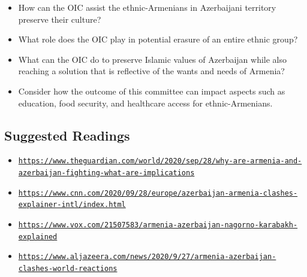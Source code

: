 \documentclass[10pt, letterpaper]{article}
\begin{document}
\begin{itemize}
\item
  
  How can the OIC assist the ethnic-Armenians in Azerbaijani territory
  preserve their culture?
  
\item
  
  What role does the OIC play in potential erasure of an entire ethnic
  group?
  
\item
  
  What can the OIC do to preserve Islamic values of Azerbaijan while
  also reaching a solution that is reflective of the wants and needs of
  Armenia?
  
\item
  
  Consider how the outcome of this committee can impact aspects such as
  education, food security, and healthcare access for ethnic-Armenians.
  
\end{itemize}

\subsection{Suggested Readings}

\begin{itemize}
\item
  
  \texttt{\href{https://www.theguardian.com/world/2020/sep/28/why-are-armenia-and-azerbaijan-fighting-what-are-implications}{{https://www.theguardian.com/world/2020/sep/28/why-are-armenia-and-azerbaijan-fighting-what-are-implications}}}
  
\item
  
  \texttt{\href{https://www.cnn.com/2020/09/28/europe/azerbaijan-armenia-clashes-explainer-intl/index.html}{{https://www.cnn.com/2020/09/28/europe/azerbaijan-armenia-clashes-explainer-intl/index.html}}}
  
\item
  
  \texttt{\href{https://www.vox.com/21507583/armenia-azerbaijan-nagorno-karabakh-explained}{{https://www.vox.com/21507583/armenia-azerbaijan-nagorno-karabakh-explained}}}
  
\item
  
  \texttt{\href{https://www.aljazeera.com/news/2020/9/27/armenia-azerbaijan-clashes-world-reactions}{{https://www.aljazeera.com/news/2020/9/27/armenia-azerbaijan-clashes-world-reactions}}}
  
\end{itemize}
\end{document}

